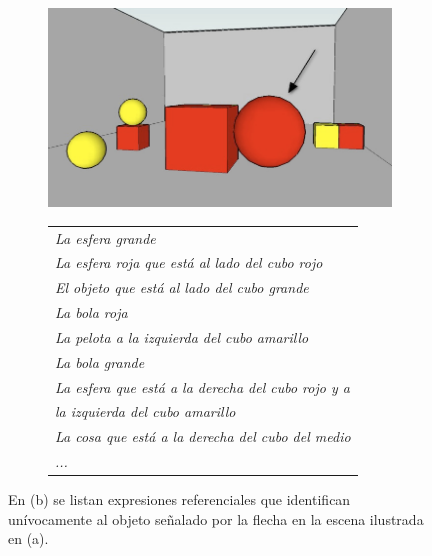\begin{figure}[h]
\begin{subfigure}{.5\textwidth}
  \centering
\includegraphics[width=\textwidth]{images/22sinletrasClaro.jpg}
  \caption{}\label{GRE3D7-stimulus1}
\end{subfigure}%
\begin{subfigure}{.5\textwidth}
 \centering
\begin{tabular}{l}
 {\it La esfera grande}\\

 {\it La esfera roja que est\'a al lado del cubo rojo} \\

 {\it El objeto que est\'a al lado del cubo grande}\\

 {\it La bola roja}\\

 {\it La pelota a la izquierda del cubo amarillo}\\

 {\it La bola grande}\\

 {\it La esfera que est\'a a la derecha del cubo rojo y a }\\
{\it la izquierda del cubo amarillo}\\

 {\it La cosa que est\'a a la derecha del cubo del medio}\\

  {\it ...}
 \end{tabular}
\hspace*{-30cm}
\centering\caption{}\label{er-figura1}
\end{subfigure}
\begin{centering}
\caption{En (b) se listan expresiones referenciales que identifican un\'ivocamente al objeto se\~nalado por la flecha en la escena ilustrada en (a).}
\label{figura-er}
\end{centering}
\end{figure}


